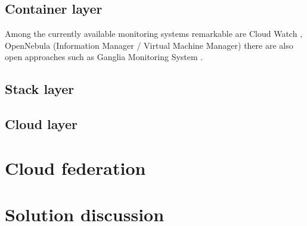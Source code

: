 \subsection{Container layer}
Among the currently available monitoring systems remarkable are Cloud Watch \cite{CloudWatch}, OpenNebula (Information Manager / Virtual Machine Manager) \cite{OpenNebula} there are also open approaches such as Ganglia Monitoring System \cite{MaChCu04}.

\subsection{Stack layer}

\subsection{Cloud layer}


\section{Cloud federation}

\section{Solution discussion}
